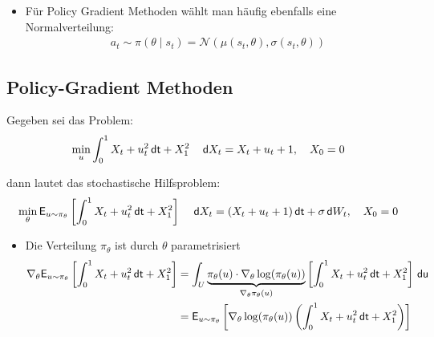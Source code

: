 \documentclass[a4paper, 12pt]{scrartcl}
\newcommand{\dt}{\thinspace \mathsf{dt}}
\newcommand{\du}{\thinspace \mathsf{du}}
\newcommand{\dW}{\thinspace \mathsf{d}W}
\newcommand{\dX}{\thinspace \mathsf{d}X}
\begin{document}
\begin{beispiel}
\begin{itemize}
        \item Für Policy Gradient Methoden wählt man häufig ebenfalls eine Normalverteilung:
        \begin{align*}
            a_t \sim \pi(\theta \mid s_t) = \mathcal{N}
            \left(
                \mu(s_t, \theta), 
                \sigma(s_t, \theta)
            \right)
        \end{align*}
    \end{itemize}
\end{beispiel}

\subsection{Policy-Gradient Methoden}

\begin{beispiel} 
    Gegeben sei das Problem: 
    \begin{align*}
        \min_{u} \int_0^1 X_t +u_t^2  \dt + X_1^2  
        \quad 
        \dX_t = X_t + u_t + 1, 
        \quad X_0 = 0
    \end{align*}

    dann lautet das stochastische Hilfsproblem:
    \begin{align*}
        \min_{\theta} \mathsf{E}_{u \sim \pi_{\theta}}
        \left[
            \int_0^1 X_t +u_t^2  \dt + X_1^2  
        \right]
        \quad 
        \dX_t = (X_t + u_t + 1) \dt + \sigma \dW_t, 
        \quad X_0 = 0
    \end{align*}

    \begin{itemize}
        \item[1.] Die Verteilung $\pi_\theta$ ist durch $\theta$ parametrisiert
        \begin{align*}
            \nabla_{\theta}
            \mathsf{E}_{u \sim \pi_{\theta}}
            \left[
                \int_0^1 X_t +u_t^2  \dt + X_1^2  
            \right]
            &=
            \int_U 
            \underbrace{
                \pi_{\theta}(u) \cdot \nabla_{\theta} \log(\pi_{\theta}(u))
            }_{
                \nabla_{\theta} \pi_{\theta}(u)
            }
            \left[
                \int_0^1 X_t +u_t^2  \dt + X_1^2  
            \right]
            \du
            \\
            &=
            \mathsf{E}_{u \sim \pi_{\theta}}
            \left[
                \nabla_{\theta} \log(\pi_{\theta}(u))
                \left(
                    \int_0^1 X_t +u_t^2  \dt + X_1^2  
                \right)
            \right]
        \end{align*}


\end{itemize}
\end{beispiel}
\end{document}
